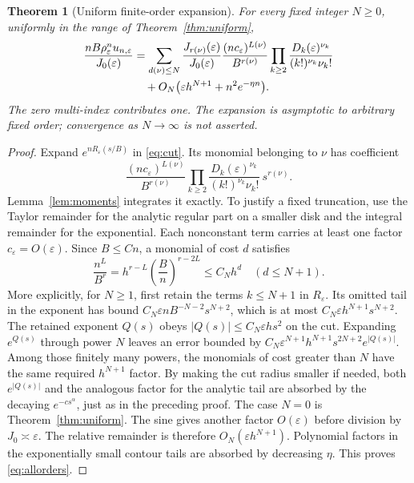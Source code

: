 \documentclass[11pt,a4paper]{article}
\newtheorem{theorem}{Theorem}[section]
\theoremstyle{definition}\newtheorem{definition}[theorem]{Definition}
\theoremstyle{remark}\newtheorem{remark}[theorem]{Remark}
\newcommand{\eps}{\varepsilon}
\newcommand{\1}{\mathbf 1}
\begin{document}
\begin{theorem}[Uniform finite-order expansion]\label{thm:allorders}
For every fixed integer $N\ge0$, uniformly in the range of
Theorem~\ref{thm:uniform},
\begin{align}
 \frac{nB\rho_{\eps}^{n}u_{n,\eps}}{J_0(\eps)}
 &=\sum_{d(\nu)\le N}
 \frac{J_{r(\nu)}(\eps)}{J_0(\eps)}
 \frac{(nc_{\eps})^{L(\nu)}}{B^{r(\nu)}}
 \prod_{k\ge2}\frac{D_k(\eps)^{\nu_k}}
 {(k!)^{\nu_k}\nu_k!}\notag\\
 &\quad+O_N\bigl(\eps h^{N+1}+n^2e^{-\eta n}\bigr).
 \label{eq:allorders}
\end{align}
The zero multi-index contributes one. The expansion is asymptotic to
arbitrary fixed order; convergence as $N\to\infty$ is not asserted.
\end{theorem}
\begin{proof}
Expand $e^{nR_{\eps}(s/B)}$ in \eqref{eq:cut}. Its monomial belonging to
$\nu$ has coefficient
\[
 \frac{(nc_{\eps})^{L(\nu)}}{B^{r(\nu)}}
 \prod_{k\ge2}\frac{D_k(\eps)^{\nu_k}}
 {(k!)^{\nu_k}\nu_k!}\ s^{r(\nu)}.
\]
Lemma~\ref{lem:moments} integrates it exactly. To justify a fixed
truncation, use the Taylor remainder for the analytic regular part on a
smaller disk and the integral remainder for the exponential. Each
nonconstant term carries at least one factor $c_{\eps}=O(\eps)$.
Since $B\le Cn$, a monomial of cost $d$ satisfies
\[
 \frac{n^{L}}{B^r}
 =h^{r-L}\left(\frac Bn\right)^{r-2L}
 \le C_N h^d\quad(d\le N+1).
\]
More explicitly, for $N\ge1$, first retain the terms $k\le N+1$
in $R_{\eps}$. Its omitted tail in the exponent has bound
$C_N\eps n B^{-N-2}s^{N+2}$, which is at most
$C_N\eps h^{N+1}s^{N+2}$. The retained exponent $Q(s)$ obeys
$|Q(s)|\le C_N\eps h s^2$ on the cut. Expanding $e^{Q(s)}$ through
power $N$ leaves an error bounded by
$C_N\eps^{N+1}h^{N+1}s^{2N+2}e^{|Q(s)|}$. Among those finitely many
powers, the monomials of cost greater than $N$ have the same required
$h^{N+1}$ factor. By making the cut radius smaller if needed, both
$e^{|Q(s)|}$ and the analogous factor for the analytic tail are absorbed
by the decaying $e^{-c s^{\alpha}}$, just as in the preceding proof.
The case $N=0$ is Theorem~\ref{thm:uniform}. The sine gives another
factor $O(\eps)$ before division by $J_0\asymp\eps$. The relative
remainder is therefore $O_N(\eps h^{N+1})$.
Polynomial factors in the exponentially small contour tails are
absorbed by decreasing $\eta$. This proves \eqref{eq:allorders}.
\end{proof}
\end{document}
